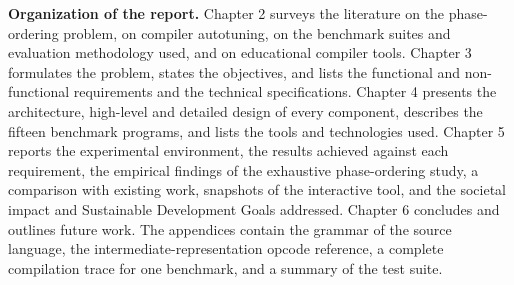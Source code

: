 \textbf{Organization of the report.} Chapter 2 surveys the literature on the phase-ordering problem, on compiler autotuning, on the benchmark suites and evaluation methodology used, and on educational compiler tools. Chapter 3 formulates the problem, states the objectives, and lists the functional and non-functional requirements and the technical specifications. Chapter 4 presents the architecture, high-level and detailed design of every component, describes the fifteen benchmark programs, and lists the tools and technologies used. Chapter 5 reports the experimental environment, the results achieved against each requirement, the empirical findings of the exhaustive phase-ordering study, a comparison with existing work, snapshots of the interactive tool, and the societal impact and Sustainable Development Goals addressed. Chapter 6 concludes and outlines future work. The appendices contain the grammar of the source language, the intermediate-representation opcode reference, a complete compilation trace for one benchmark, and a summary of the test suite.

